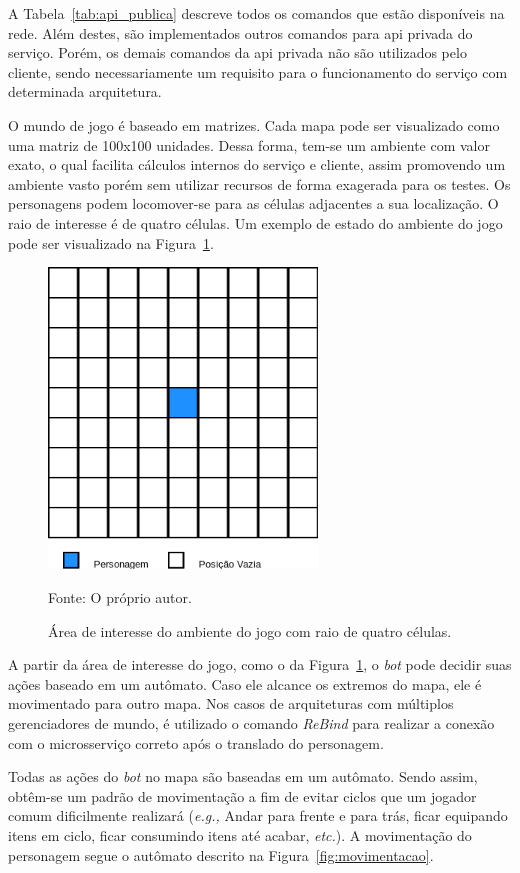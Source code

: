 A Tabela~\ref{tab:api_publica} descreve todos os comandos que estão disponíveis na rede.
%
Além destes, são implementados outros comandos para \ac{api} privada do serviço.
%
Porém, os demais comandos da \ac{api} privada não são utilizados pelo cliente, sendo necessariamente um requisito para o funcionamento do serviço com determinada arquitetura.


O mundo de jogo é baseado em matrizes.
%
Cada mapa pode ser visualizado como uma matriz de 100x100 unidades.
%
Dessa forma, tem-se um ambiente com valor exato, o qual facilita cálculos internos do serviço e cliente, assim promovendo um ambiente vasto porém sem utilizar recursos de forma exagerada para os testes.
%
Os personagens podem locomover-se para as células adjacentes a sua localização.
%
O raio de interesse é de quatro células.
%
Um exemplo de estado do ambiente do jogo pode ser visualizado na Figura~\ref{fig:roi}.

\begin{figure}[htb!]
  \caption{Área de interesse do ambiente do jogo com raio de quatro células.}
  \label{fig:roi}
  \includegraphics[height=8.0cm]{img/cap3/roi.png}
  \centering

  Fonte: O próprio autor.
\end{figure}

A partir da área de interesse do jogo, como o da Figura~\ref{fig:roi}, o \textit{bot} pode decidir suas ações baseado em um autômato.
%
Caso ele alcance os extremos do mapa, ele é
 movimentado para outro mapa.
%
Nos casos de arquiteturas com múltiplos gerenciadores de mundo, é utilizado o comando \textit{ReBind} para realizar a conexão com o microsserviço correto após o translado do personagem.



Todas as ações do \textit{bot} no mapa são baseadas em um autômato.
%
Sendo assim, obtêm-se um padrão de movimentação a fim de evitar ciclos que um jogador comum dificilmente realizará (\textit{e.g.,} Andar para frente e para trás, ficar equipando itens em ciclo, ficar consumindo itens até acabar, \textit{etc.}).
%
A movimentação do personagem segue o autômato descrito na Figura~\ref{fig:movimentacao}.
\pagebreak

